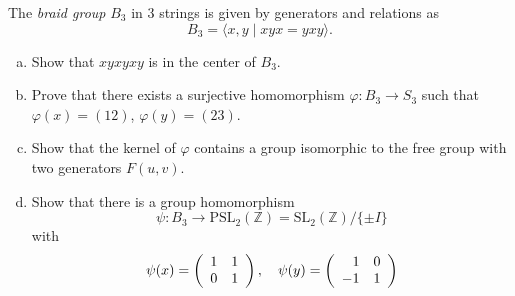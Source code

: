 \documentclass{article}
\newcounter{Problem}
\newenvironment{Problem}{\begin{Exercise}[name={Problem},
                                          counter={Problem}]}
                        {\end{Exercise}}
\begin{document}
\pagebreak

\begin{Problem}
The \emph{braid group} $B_3$ in 3 strings is given by generators and
relations as
$$
B_3 = \langle x, y \mid xyx = yxy \rangle.
$$

\begin{enumerate}[(a)]
  \item{
    Show that $xyxyxy$ is in the center of $B_3$.
  }
  \item{
    Prove that there exists a surjective homomorphism
    $\varphi : B_3 \to S_3$ such that $\varphi(x) = (12)$,
    $\varphi(y) = (23)$.
  }
  \item{
    Show that the kernel of $\varphi$ contains a group isomorphic to
    the free group with two generators $F(u,v)$.
  }
  \item{
    Show that there is a group homomorphism
    $$
    \psi : B_3
       \to \mathrm{PSL}_2(\mathbb{Z})
         = \mathrm{SL}_2(\mathbb{Z}) / \{ \pm I \}
    $$
    with
    $$
    \psi(x) =
    \left(\begin{array}{r r}
      1 & 1 \\
      0 & 1
    \end{array}\right), \quad
    \psi(y) =
    \left(\begin{array}{r r}
      1 & 0 \\
     -1 & 1
    \end{array}\right)
    $$
  }
\end{enumerate}
\end{Problem}
\end{document}
